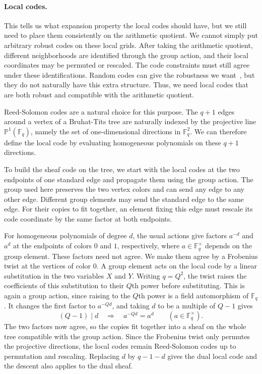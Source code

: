 \documentclass[11pt,letterpaper]{article}
\theoremstyle{definition}
\theoremstyle{remark}
\newcommand{\F}{\mathbb F}
\newcommand{\PP}{\mathbb P}
\begin{document}
\paragraph{Local codes.}
This tells us what expansion property the local codes should have, but we still need to place them consistently on the arithmetic quotient. We cannot simply put arbitrary robust codes on these local grids. After taking the arithmetic quotient, different neighborhoods are identified through the group action, and their local coordinates may be permuted or rescaled. The code constraints must still agree under these identifications. Random codes can give the robustness we want~\cite{KalachevPanteleev2025}, but they do not naturally have this extra structure. Thus, we need local codes that are both robust and compatible with the arithmetic quotient.

Reed-Solomon codes are a natural choice for this purpose. The $q+1$ edges around a vertex of a Bruhat-Tits tree are naturally indexed by the projective line $\PP^1(\F_q)$, namely the set of one-dimensional directions in $\F_q^2$. We can therefore define the local code by evaluating homogeneous polynomials on these $q+1$ directions.

To build the sheaf code on the tree, we start with the local codes at the two endpoints of one standard edge and propagate them using the group action. The group used here preserves the two vertex colors and can send any edge to any other edge. Different group elements may send the standard edge to the same edge. For their copies to fit together, an element fixing this edge must rescale its code coordinate by the same factor at both endpoints.

For homogeneous polynomials of degree $d$, the usual actions give factors $a^{-d}$ and $a^d$ at the endpoints of colors $0$ and $1$, respectively, where $a\in\F_q^\times$ depends on the group element. These factors need not agree. We make them agree by a Frobenius twist at the vertices of color $0$. A group element acts on the local code by a linear substitution in the two variables $X$ and $Y$. Writing $q=Q^2$, the twist raises the coefficients of this substitution to their $Q$th power before substituting. This is again a group action, since raising to the $Q$th power is a field automorphism of $\F_q$. It changes the first factor to $a^{-Qd}$, and taking $d$ to be a multiple of $Q-1$ gives
\[
 (Q-1)\mid d\quad\Longrightarrow\quad
 a^{-Qd}=a^d\qquad(a\in\F_q^\times).
\]
The two factors now agree, so the copies fit together into a sheaf on the whole tree compatible with the group action. Since the Frobenius twist only permutes the projective directions, the local codes remain Reed-Solomon codes up to permutation and rescaling. Replacing $d$ by $q-1-d$ gives the dual local code and the descent also applies to the dual sheaf.
\end{document}
